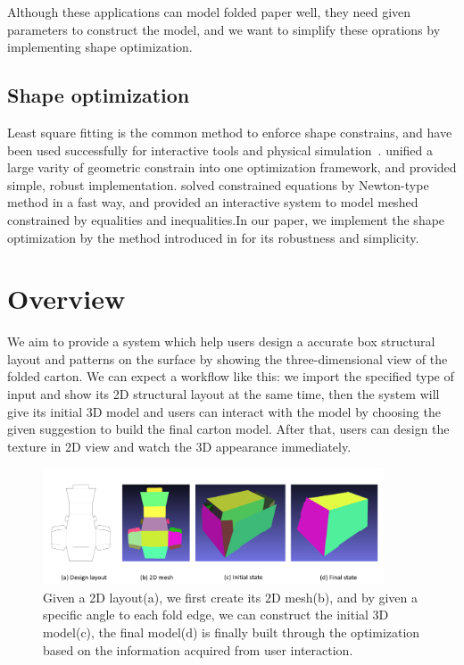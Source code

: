 \documentclass[submission]{gmp2018}
\begin{document}
Although these applications can model folded paper well, they need given parameters to construct the model, and we want to simplify these oprations by implementing shape optimization.

\subsection{Shape optimization}
Least square fitting is the common method to enforce shape constrains, and have been used successfully for interactive tools and physical simulation~\cite{Botsch:2006:PCP:1281957.1281959,Igarashi:2005:ASM:1186822.1073323}. \cite{Bouaziz:2012:SSD:2346796.2346802} unified a large varity of geometric constrain into one optimization framework, and provided simple, robust implementation. \cite{Tang:2014:FPM:2601097.2601213} solved constrained equations by Newton-type method in a fast way, and provided an interactive system to model meshed constrained by equalities and inequalities.In our paper, we implement the shape optimization by the method introduced in \cite{Bouaziz:2012:SSD:2346796.2346802} for its robustness and simplicity.


\section{Overview}\label{sec:overview}
We aim to provide a system which help users design a accurate box structural layout and patterns on the surface by showing the three-dimensional view of the folded carton. We can expect a workflow like this: we import the specified type of input and show its 2D structural layout at the same time, then the system will give its initial 3D model and users can interact with the model by choosing the given suggestion to build the final carton model. After that, users can design the texture in 2D view and watch the 3D appearance immediately.

\begin{figure}
	\centering
	\includegraphics[width=0.9\textwidth]{images/overview.png}
	\caption{Given a 2D layout(a), we first create its 2D mesh(b), and by given a specific angle to each fold edge, we can construct the initial 3D model(c), the final model(d) is finally built through the optimization based on the information acquired from user interaction.}
	\label{fig:overview}
\end{figure} 
\end{document}
